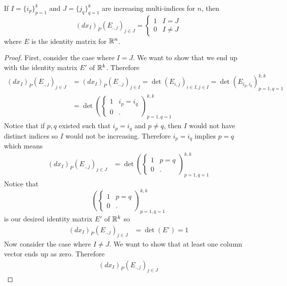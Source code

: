 \documentclass[notes]{subfiles}
\begin{document}
\begin{theorem}
    If $I = \{i_p\}_{p = 1}^k$ and $J = \{j_q\}_{q = 1}^k$ are increasing multi-indices for $n$, then
    \[
        (dx_I)_P(E_{., j})_{j \in J} = \begin{cases}
            1 & I = J \\
            0 & I \neq J
        \end{cases}
    \]
    where $E$ is the identity matrix for $\mathbb{R}^n$.
\end{theorem}
\begin{proof}
    First, consider the case where $I = J$. We want to show that we end up with the identity matrix $E'$ of $\mathbb{R}^k$. Therefore
    \begin{align*}
        (dx_I)_P(E_{., j})_{j \in J}
        &= (dx_I)_P(E_{., j})_{j \in I}
        = \det(E_{i, j})_{i \in I, j \in I}
        = \det(E_{i_p, i_q})_{p = 1, q = 1}^{k, k} \\
        &= \det\left(\begin{cases}
            1 & i_p = i_q \\
            0 & .
        \end{cases}\right)_{p = 1, q = 1}^{k, k}
    \end{align*}
    Notice that if $p, q$ existed such that $i_p = i_q$ and $p \neq q$, then $I$ would not have distinct indices so $I$ would not be increasing. Therefore $i_p = i_q$ implies $p = q$ which means
    \begin{align*}
        (dx_I)_P(E_{., j})_{j \in J}
        &= \det\left(\begin{cases}
            1 & p = q \\
            0 & .
        \end{cases}\right)_{p = 1, q = 1}^{k, k}
    \end{align*}
    Notice that \[
        \left(\begin{cases}
            1 & p = q \\
            0 & .
        \end{cases}\right)_{p = 1, q = 1}^{k, k}
    \]
    is our desired identity matrix $E'$ of $\mathbb{R}^k$ so
    \begin{align*}
        (dx_I)_P(E_{., j})_{j \in J}
        &= \det(E')
        = 1
    \end{align*}
    Now consider the case where $I \neq J$. We want to show that at least one column vector ends up as zero. Therefore
    \begin{align*}
        (dx_I)_P(E_{., j})_{j \in J}

\end{align*}
\end{proof}
\end{document}
